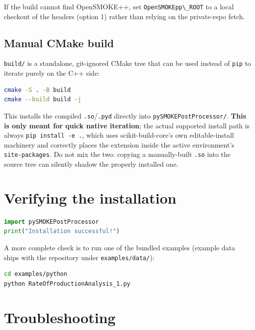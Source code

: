 \documentclass[11pt,a4paper]{report}
\newcommand{\pkg}[1]{\lstinline|#1|}
\begin{document}
If the build cannot find OpenSMOKE++, set \pkg{OpenSMOKEpp\_ROOT} to a local
checkout of the headers (option 1) rather than relying on the private-repo fetch.

\section{Manual CMake build}

\pkg{build/} is a standalone, git-ignored CMake tree that can be used instead
of \pkg{pip} to iterate purely on the C++ side:

\begin{lstlisting}[language=bash]
cmake -S . -B build
cmake --build build -j
\end{lstlisting}

This installs the compiled \pkg{.so}/\pkg{.pyd} directly into
\pkg{pySMOKEPostProcessor/}. \textbf{This is only meant for quick native
iteration}; the actual supported install path is always \pkg{pip install -e .},
which uses scikit-build-core's own editable-install machinery and correctly
places the extension inside the active environment's \pkg{site-packages}. Do
not mix the two: copying a manually-built \pkg{.so} into the source tree can
silently shadow the properly installed one.

\chapter{Verifying the installation}

\begin{lstlisting}[language=Python]
import pySMOKEPostProcessor
print("Installation successful!")
\end{lstlisting}

A more complete check is to run one of the bundled examples (example data
ships with the repository under \pkg{examples/data/}):

\begin{lstlisting}[language=bash]
cd examples/python
python RateOfProductionAnalysis_1.py
\end{lstlisting}

\chapter{Troubleshooting}
\end{document}
